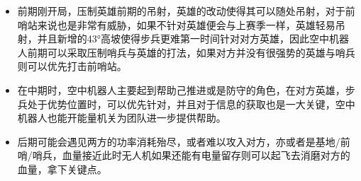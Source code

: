             \begin{itemize}
                \item 前期刚开局，压制英雄前期的吊射，英雄的改动使得其可以随处吊射，对于前哨站来说也是非常有威胁，如果不针对英雄便会与上赛季一样，英雄轻易吊射，并且新增的43°高坡使得步兵更难第一时间针对对方英雄，因此空中机器人前期可以采取压制哨兵与英雄的打法，如果对方并没有很强势的英雄与哨兵则可以优先打击前哨站。
                \item 在中期时，空中机器人主要起到帮助己推进或是防守的角色，在对方英雄，步兵处于优势位置时，可以优先针对，并且对于信息的获取也是一大关键，空中机器人也能开能量机关为团队进一步提供帮助。
                \item 后期可能会遇见两方的功率消耗殆尽，或者难以攻入对方，亦或者是基地/前哨/哨兵，血量接近此时无人机如果还能有电量留存则可以起飞去消磨对方的血量，拿下关键点。
            \end{itemize}